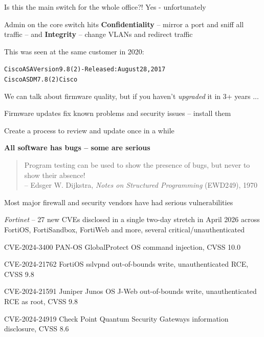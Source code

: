 \documentclass[Screen16to9,17pt]{foils}
\begin{document}

\begin{list2}
\item Is this the main switch for the whole office?! Yes - unfortunately
\item Admin on the core switch hits {\bf Confidentiality} -- mirror a port and sniff all traffic -- and {\bf Integrity} -- change VLANs and redirect traffic
\end{list2}



This was seen at the same customer in 2020:
\begin{alltt}
Cisco ASA Version 9.8(2) - Released: August 28, 2017
Cisco ASDM 7.8(2)Cisco
\end{alltt}

\begin{list2}
\item We can talk about firmware quality, but if you haven't \emph{upgraded} it in 3+ years ...
\item Firmware updates fix known problems and security issues -- install them
\item Create a process to review and update once in a while
\end{list2}

{\bf All software has bugs -- some are serious}

\begin{quote}\small
Program testing can be used to show the presence of bugs, but never to show their absence!\\
-- Edsger W. Dijkstra, \emph{Notes on Structured Programming} (EWD249), 1970
\end{quote}


Most major firewall and security vendors have had serious vulnerabilities
\begin{list2}
\item \emph{Fortinet} -- 27 new CVEs disclosed in a single two-day stretch in April 2026 across FortiOS, FortiSandbox, FortiWeb and more, several critical/unauthenticated\\
\item CVE-2024-3400 PAN-OS GlobalProtect OS command injection, CVSS 10.0
\item CVE-2024-21762 FortiOS sslvpnd out-of-bounds write, unauthenticated RCE, CVSS 9.8
\item CVE-2024-21591 Juniper Junos OS J-Web out-of-bounds write, unauthenticated RCE as root, CVSS 9.8
\item CVE-2024-24919 Check Point Quantum Security Gateways information disclosure, CVSS 8.6
\end{list2}
\end{document}
